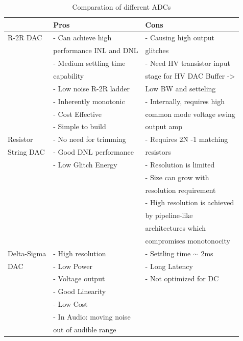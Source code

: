 \documentclass[english, 12pt, a4paper]{ifimaster}
\begin{document}
\begin{table}[!ht]
  \centering
 \begin{tabular}{|l|l|l|}
 \hline
			& Pros       			& Cons   			\\ \hline
R-2R DAC 		& - Can achieve high		& - Causing high output 	\\
			& performance INL and DNL	& glitches		   	\\ 
			& - Medium settling time	& - Need HV transistor input	\\
			& capability			&  stage for HV DAC Buffer ->	\\
			& - Low noise R-2R ladder	&  Low BW and setteling		\\
			& - Inherently monotonic	& - Internally, requires high 	\\
			& - Cost Effective		& common mode voltage swing 	\\
			& - Simple to build 		& output amp		 	\\ \hline
Resistor		& - No need for trimming	& - Requires 2\^N -1 matching 	\\
String DAC		& - Good DNL performance	& resistors			\\
			& - Low Glitch Energy		& - Resolution is limited	\\ 
			& 				& - Size can grow with 		\\
			&				& resolution requirement	\\
			& 				& - High resolution is achieved \\
			&				& by pipeline-like		\\
			& 				& architectures which 		\\
			&				& compromises monotonocity	\\ \hline
Delta-Sigma		& - High resolution		& - Settling time \(\sim\) 2ms	\\
DAC			& - Low Power			& - Long Latency		\\
			& - Voltage output		& -  Not optimized for DC	\\
			& - Good Linearity		&				\\
			& - Low Cost			&				\\
			& - In Audio: moving noise	&				\\
			& out of audible range		&				\\ \hline
 \end{tabular}
 \caption{Comparation of different ADCs}
 \label{dac:comparison}
 \end{table}
 
\end{document}
